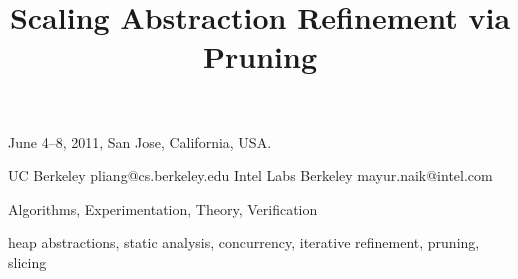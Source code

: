\documentclass[nocopyrightspace,9pt]{sigplanconf}
\begin{document}
 {June 4--8, 2011, San Jose, California, USA.}


\title{Scaling Abstraction Refinement via Pruning}

           {UC  Berkeley}
           {pliang@cs.berkeley.edu}
           {Intel Labs Berkeley}
           {mayur.naik@intel.com}




\maketitle




\terms
Algorithms, Experimentation, Theory, Verification

\keywords
heap abstractions, static analysis, concurrency, iterative refinement, pruning, slicing














\end{document}
